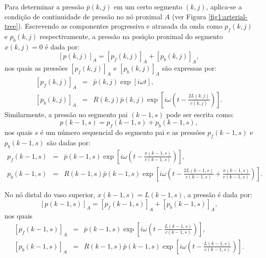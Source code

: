 Para determinar a pressão $\bar{p} (k,j)$ em um certo segmento $(k,j)$, aplica-se a condição de continuidade de pressão no nó proximal $A$ (ver Figura \ref{fig1:arterial-tree}). Escrevendo as componentes progressiva e atrasada da onda como $p_f (k,j)$ e $p_b (k,j)$ respectivamente, a pressão na posição proximal do segmento  $x(k,j) = 0$ é dada por:
\begin{equation}
	\left[ p (k,j) \right]_A = \left[ p_f (k,j) \right]_A + \left[ p_b (k,j)\right]_A,
	\label{09_p}
\end{equation}
nos quais as pressões $\left[ p_f(k,j) \right]_A$ e $\left[ p_b(k,j) \right]_A$ são expressas por:
\begin{eqnarray}
	\left[ p_f(k,j) \right]_A &=& \bar{p}(k,j)\exp\left[ i\omega t\right],
	\label{10_p_f}\\
	\left[ p_b (k,j) \right]_A &=& R(k,j)\bar{p}(k,j)\exp\left[i\omega \left(t - \frac{2L(k,j)}{c(k,j)}\right) \right].
	\label{11_p_b}
\end{eqnarray}
Similarmente, a pressão no segmento pai $(k-1,s)$ pode ser escrita como:
\begin{equation}
	p(k-1,s) =  p_f(k-1,s) + p_b (k-1,s),
	\label{12_p|_f}
\end{equation}
nos quais $s$ é um número sequencial do segmento pai e as pressões $ p_f (k-1,s)$ e $p_b (k-1,s)$ são dadas por:
\begin{eqnarray}
	p_f (k-1,s) &=& \bar{p}(k-1,s)\exp\left[i\omega \left(t - \frac{x(k-1,s)}{c (k-1,s)}\right) \right],\\
	\label{13_p_f}
	p_b (k-1,s) &=& R (k-1,s)\bar{p}(k-1,s)\exp\left[ i\omega \left( t - \frac{2L(k-1,s)}{c(k-1,s)} + \frac{x(k-1,s)}{c(k-1,s)}\right) \right]. \nonumber
\end{eqnarray}

No nó distal do vaso superior, $x(k-1,s) = L(k-1,s)$, a pressão é dada por:
\begin{equation}
	\left[ p(k-1,s) \right]_A = \left[ p_f(k-1,s)\right]_A + \left[ p_b(k-1,s) \right]_A,
	\label{13_p|_f}
\end{equation}
nos quais 
\begin{eqnarray}
	\left[ p_f(k-1,s) \right]_A &=& \bar{p}(k-1,s)\exp\left[ i\omega \left(t - \frac{L(k-1,s)}{c(k-1,s)}\right)\right],
	\label{15_p_f}
	\\
	\left[ p_b(k-1,s) \right]_A &=& R(k-1,s)\bar{p}(k-1,s)\exp\left[i\omega \left( t - \frac{L(k-1,s)}{c(k-1,s)} \right) \right]. 
	\label{16_p_b}
\end{eqnarray}

